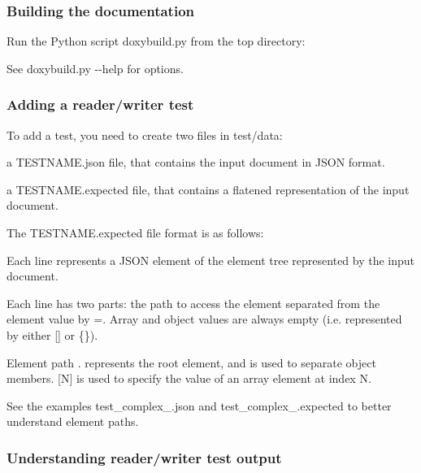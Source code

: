 \subsubsection*{Building the documentation}

Run the Python script {\ttfamily doxybuild.\+py} from the top directory\+: 


See {\ttfamily doxybuild.\+py -\/-\/help} for options.

\subsubsection*{Adding a reader/writer test}

To add a test, you need to create two files in test/data\+:


\begin{DoxyItemize}
\item a {\ttfamily T\+E\+S\+T\+N\+A\+M\+E.\+json} file, that contains the input document in J\+S\+ON format.
\item a {\ttfamily T\+E\+S\+T\+N\+A\+M\+E.\+expected} file, that contains a flatened representation of the input document.
\end{DoxyItemize}

The {\ttfamily T\+E\+S\+T\+N\+A\+M\+E.\+expected} file format is as follows\+:


\begin{DoxyItemize}
\item Each line represents a J\+S\+ON element of the element tree represented by the input document.
\item Each line has two parts\+: the path to access the element separated from the element value by {\ttfamily =}. Array and object values are always empty (i.\+e. represented by either {\ttfamily \mbox{[}\mbox{]}} or {\ttfamily \{\}}).
\item Element path {\ttfamily .} represents the root element, and is used to separate object members. {\ttfamily \mbox{[}N\mbox{]}} is used to specify the value of an array element at index {\ttfamily N}.
\end{DoxyItemize}

See the examples {\ttfamily test\+\_\+complex\+\_.\+json} and {\ttfamily test\+\_\+complex\+\_.\+expected} to better understand element paths.

\subsubsection*{Understanding reader/writer test output}

